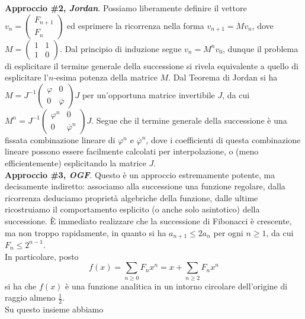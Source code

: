 \documentclass[a4paper,twoside]{article}
\theoremstyle{definition}
\numberwithin{theorem}{section}
\begin{document}
\textbf{Approccio \#2, \emph{Jordan}}. Possiamo liberamente definire il vettore $v_n=\begin{pmatrix} F_{n+1} \\ F_{n}\end{pmatrix}$ ed esprimere la ricorrenza nella forma $v_{n+1} = M v_n$, dove $M=\begin{pmatrix} 1 & 1 \\ 1 & 0\end{pmatrix}$. Dal principio di induzione segue $v_n = M^n v_0$, dunque il problema di esplicitare il termine generale della successione si rivela equivalente a quello di esplicitare l'$n$-esima potenza della matrice $M$. Dal Teorema di Jordan si ha $M = J^{-1}\begin{pmatrix}\varphi & 0 \\ 0 & \overline{\varphi}\end{pmatrix} J$ per un'opportuna matrice invertibile $J$, da cui $M^n = J^{-1}\begin{pmatrix}\varphi^n & 0 \\ 0 & \overline{\varphi}^n\end{pmatrix} J$. Segue che il termine generale della successione è una fissata combinazione lineare di $\varphi^n$ e $\overline{\varphi}^n$, dove i coefficienti di questa combinazione lineare possono essere facilmente calcolati per interpolazione, o (meno efficientemente) esplicitando la matrice $J$.\\

\textbf{Approccio \#3, \emph{OGF}}. Questo è un approccio estremamente potente, ma decisamente indiretto: associamo alla successione una funzione regolare, dalla ricorrenza deduciamo proprietà algebriche della funzione, dalle ultime ricostruiamo il comportamento esplicito (o anche solo asintotico) della successione. È immediato realizzare che la successione di Fibonacci è crescente, ma non troppo rapidamente, in quanto si ha $a_{n+1}\leq 2 a_n$ per ogni $n\geq 1$, da cui $F_n \leq 2^{n-1}$.\\ In particolare, posto 
$$ f(x) = \sum_{n\geq 0} F_n x^n  = x + \sum_{n\geq 2}F_n x^n$$
si ha che $f(x)$ è una funzione analitica in un intorno circolare dell'origine di raggio almeno $\frac{1}{2}$.\\ Su questo insieme abbiamo 
\end{document}

